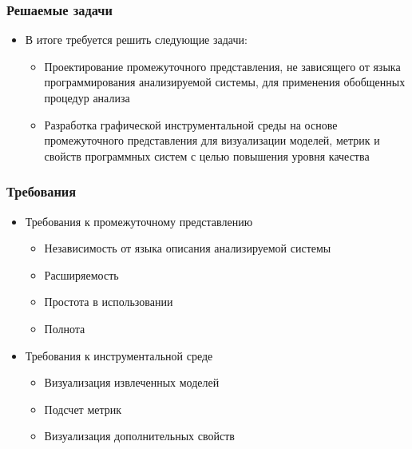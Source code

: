 \documentclass[handout]{beamer}
\begin{document}
\begin{frame}
\frametitle{Решаемые задачи}

\begin{itemize}
    \item В итоге требуется решить следующие задачи:
        \begin{itemize}
            \item Проектирование промежуточного представления, не зависящего от
            языка программирования анализируемой системы, для применения
            обобщенных процедур анализа
            \item Разработка графической инструментальной среды на основе
            промежуточного представления для визуализации моделей, метрик и
            свойств программных систем с целью повышения уровня качества
        \end{itemize}

\end{itemize}

\end{frame}
\begin{frame}
\frametitle{Требования}

\begin{itemize}
    \item Требования к промежуточному представлению
        \begin{itemize}
            \item Независимость от языка описания анализируемой системы
            \item Расширяемость
            \item Простота в использовании
            \item Полнота
        \end{itemize}
    \item Требования к инструментальной среде
        \begin{itemize}
            \item Визуализация извлеченных моделей
            \item Подсчет метрик
            \item Визуализация дополнительных свойств
        \end{itemize}
\end{itemize}

\end{frame}
\end{document}
